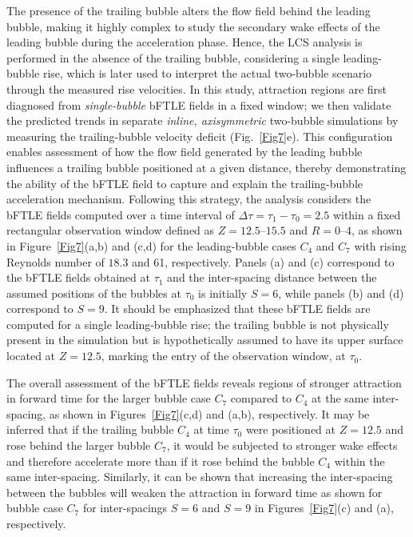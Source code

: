 \documentclass[aps,prfluids,reprint,nofootinbib,onecolumn,groupedaddress,showkeys]{revtex4-2}
\begin{document}
	The presence of the trailing bubble alters the flow field behind the leading bubble, making it highly complex to study the secondary wake effects of the leading bubble during the acceleration phase. Hence, the LCS analysis is performed in the absence of the trailing bubble, considering a single leading-bubble rise, which is later used to interpret the actual two-bubble scenario through the measured rise velocities. {\color{black}In this study, attraction regions are first diagnosed from \textit{single-bubble} bFTLE fields in a fixed window; we then validate the predicted trends in separate \textit{inline, axisymmetric} two-bubble simulations by measuring the trailing-bubble velocity deficit (Fig.~\ref{Fig7}e).} This configuration enables assessment of how the flow field generated by the leading bubble influences a trailing bubble positioned at a given distance, thereby demonstrating the ability of the bFTLE field to capture and explain the trailing-bubble acceleration mechanism. Following this strategy, the analysis considers the bFTLE fields computed over a time interval of $\Delta\tau = \tau_1 - \tau_0 = 2.5$ within a fixed rectangular observation window defined as $Z = 12.5$–$15.5$ and $R = 0$–$4$, as shown in Figure~\ref{Fig7}(a,b) and (c,d) for the leading-bubble cases $C_4$ and $C_7$ with rising Reynolds number of $18.3$ and 61, respectively. Panels (a) and (c) correspond to the bFTLE fields obtained at $\tau_1$ and the inter-spacing distance between the assumed positions of the bubbles at $\tau_0$ is initially $S = 6$, while panels (b) and (d) correspond to $S = 9$. It should be emphasized that these bFTLE fields are computed for a single leading-bubble rise; the trailing bubble is not physically present in the simulation but is hypothetically assumed to have its upper surface located at $Z = 12.5$, marking the entry of the observation window, at $\tau_0$. 
	
	The overall assessment of the bFTLE fields reveals regions of stronger attraction in forward time for the larger bubble case $C_7$ compared to $C_4$ at the same inter-spacing, as shown in Figures~\ref{Fig7}(c,d) and (a,b), respectively. It may be inferred that if the trailing bubble $C_4$ at time $\tau_0$ were positioned at $Z = 12.5$ and rose behind the larger bubble $C_7$, it would be subjected to stronger wake effects and therefore accelerate more than if it rose behind the bubble $C_4$ within the same inter-spacing. Similarly, it can be shown that increasing the inter-spacing between the bubbles will weaken the attraction in forward time as shown for bubble case $C_7$ for inter-spacings $S=6$ and $S=9$ in Figures~\ref{Fig7}(c) and (a), respectively. 
	
\end{document}
